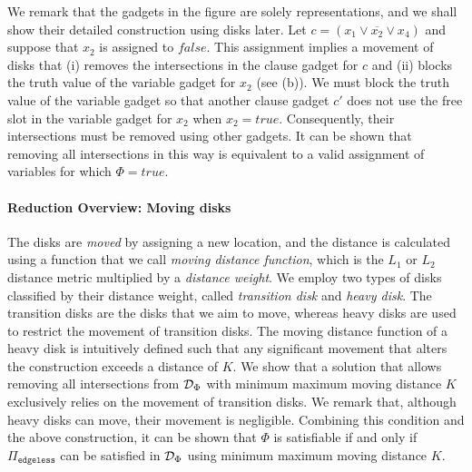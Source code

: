 \ifFull
We remark that the gadgets in the figure are solely representations, and we shall show their detailed construction using disks later.
\fi
Let $c = (x_1 \lor \overline{x_2} \lor x_4)$ and suppose that $x_2$ is assigned to $\mathit{false}$.
This assignment implies a movement of disks that (i) removes the intersections in the clause gadget for $c$ and (ii) blocks the truth value of the variable gadget for $x_2$ (see (b)).
%
%
We must block the truth value of the variable gadget so that another clause gadget $c'$ does not use the free slot in the variable gadget for $x_2$ when $x_2 = \mathit{true}$.
%
Consequently, their intersections must be removed using other gadgets.
It can be shown that removing all intersections in this way is equivalent to a valid assignment of variables for which $\Phi = \mathit{true}$. 
\ifFull
\paragraph*{Reduction Overview: Moving disks} 
\fi
The disks are \emph{moved} by assigning a new location, and the distance is calculated using a function that we call \emph{moving distance function}, which is the $L_1$ or $L_2$ distance metric multiplied by a \emph{distance weight}.
We employ two types of disks classified by their distance weight, called \emph{transition disk} and \emph{heavy disk}. 
The transition disks are the disks that we aim to move, whereas heavy disks are used to restrict the movement of transition disks.
%
%
The moving distance function of a heavy disk is intuitively defined such that any significant movement that alters the construction exceeds a distance of $K$. We show that a solution that allows removing all intersections from $\mathcal{D}_\Phi$ with minimum maximum moving distance $K$ exclusively relies on the movement of transition disks.
%
We remark that, although heavy disks can move, their movement is negligible. 
Combining this condition and the above construction, it can be shown that $\Phi$ is satisfiable if and only if $\Pi_{\texttt{edgeless}}$ can be satisfied in $\mathcal{D}_\Phi$ using minimum maximum moving distance $K$.%

